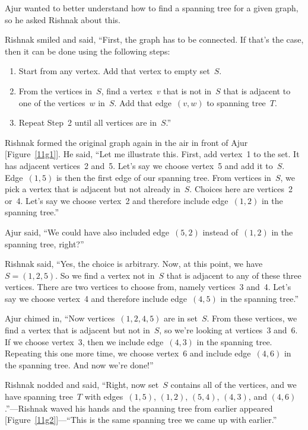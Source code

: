Ajur wanted to better understand how to find a spanning tree for a given graph, so he asked Rishnak about this.

Rishnak smiled and said, ``First, the graph has to be connected. If that's the case, then it can be done using the following steps:
\begin{enumerate}
\item Start from any vertex. Add that vertex to empty set~$S$.
\item From the vertices in~$S$, find a vertex~$v$ that is not in~$S$ that is adjacent to one of the vertices~$w$ in~$S$. Add that edge~$(v,w)$ to spanning tree~$T$.
\item Repeat Step~2 until all vertices are in~$S$.''
\end{enumerate}

Rishnak formed the original graph again in the air in front of Ajur [Figure~\ref{11g1}]. He said, ``Let me illustrate this. First, add vertex~1 to the set. It has adjacent vertices~2 and~5. Let's say we choose vertex~5 and add it to~$S$. Edge~$(1,5)$ is then the first edge of our spanning tree. From vertices in~$S$, we pick a vertex that is adjacent but not already in~$S$. Choices here are vertices~2 or~4. Let's say we choose vertex~2 and therefore include edge~$(1,2)$ in the spanning tree.''

Ajur said, ``We could have also included edge~$(5,2)$ instead of~$(1,2)$ in the spanning tree, right?''

Rishnak said, ``Yes, the choice is arbitrary. Now, at this point, we have~$S=(1,2,5)$. So we find a vertex not in~$S$ that is adjacent to any of these three vertices. There are two vertices to choose from, namely vertices~3 and~4. Let's say we choose vertex~4 and therefore include edge~$(4,5)$ in the spanning tree.''

Ajur chimed in, ``Now vertices~$(1,2,4,5)$ are in set~$S$. From these vertices, we find a vertex that is adjacent but not in~$S$, so we're looking at vertices~3 and~6. If we choose vertex~3, then we include edge~$(4,3)$ in the spanning tree. Repeating this one more time, we choose vertex~6 and include edge~$(4,6)$ in the spanning tree. And now we're done!''

Rishnak nodded and said, ``Right, now set~$S$ contains all of the vertices, and we have spanning tree~$T$ with edges~$(1,5)$, $(1,2)$, $(5,4)$, $(4,3)$, and $(4,6)$.''---Rishnak waved his hands and the spanning tree from earlier appeared [Figure~\ref{11g2}]---``This is the same spanning tree we came up with earlier.''

